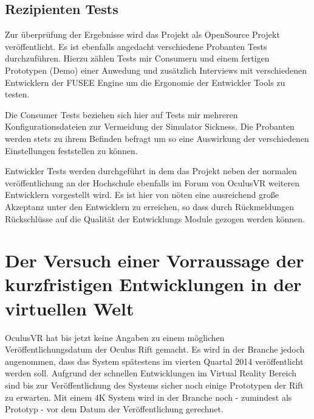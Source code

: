 \documentclass[pagesize, paper=a4, fontsize=12pt,titlepage=true, headings=small, headnosepline, abstractoff, liststotoc, nochapterprefix, plainheadsepline]{scrreprt}
\begin{document}
\section{Rezipienten Tests}
Zur überprüfung der Ergebnisse wird das Projekt als OpenSource Projekt veröffentlicht. Es ist ebenfalls angedacht verschiedene Probanten Tests durchzuführen. Hierzu zählen Tests mir Consumern und einem fertigen Prototypen (Demo) einer Anwedung und zusätzlich Interviews mit verschiedenen Entwicklern der FUSEE Engine um die Ergonomie der Entwickler Tools zu testen.

Die Consumer Tests beziehen sich hier auf Tests mir mehreren Konfigurationsdateien zur Vermeidung der Simulator Sickness. Die Probanten werden stets zu ihrem Befinden befragt um so eine Auswirkung der verschiedenen Einstellungen feststellen zu können.

 Entwickler Tests werden durchgeführt in dem das Projekt neben der normalen veröffentlichung an der Hochschule ebenfalls im Forum von OculusVR weiteren Entwicklern vorgestellt wird. Es ist hier von nöten eine ausreichend große Akzeptanz unter den Entwicklern zu erreichen, so dass durch Rückmeldungen Rückschlüsse auf die Qualität der Entwicklungs Module gezogen werden können. 



\chapter{Der Versuch einer Vorraussage der kurzfristigen Entwicklungen in der virtuellen Welt}
OculusVR hat bis jetzt keine Angaben zu einem möglichen Veröffentlichungsdatum der Oculus Rift gemacht. Es wird in der Branche jedoch angenommen, dass das System spätestens im vierten Quartal 2014 veröffentlicht werden soll. Aufgrund der schnellen Entwicklungen im Virtual Reality Bereich sind bis zur Veröffentlichung des Systems sicher noch einige Prototypen der Rift zu erwarten. Mit einem 4K System wird in der Branche noch - zumindest als Prototyp - vor dem Datum der Veröffentlichung gerechnet.
\end{document}
